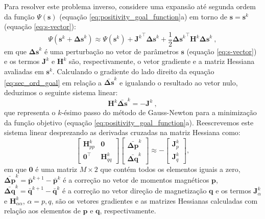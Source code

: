 Para resolver este problema inverso, considere uma expansão até segunda ordem da função $\Psi(\mathbf{s})$
(equação \ref{eq:positivity_goal_function}a) em torno de $\mathbf{s} = \mathbf{s}^{k}$ 
(equação \ref{eq:s-vector}):
\begin{equation}
\Psi(\mathbf{s}^{k} + \mathbf{\Delta s}^{k}) \approx \Psi(\mathbf{s}^{k}) + 
{\mathbf{J}^{k}}^{\top} \mathbf{\Delta s}^{k} + 
\frac{1}{2} {\mathbf{\Delta s}^{k}}^{\top} \mathbf{H}^{k} \mathbf{\Delta s}^{k}  \: ,
\label{eq:sec_ord_goal}
\end{equation}
em que $\mathbf{\Delta s}^{k}$ é uma perturbação no vetor de parâmetros $\mathbf{s}$ 
(equação \ref{eq:s-vector}) e os termos 
$\mathbf{J}^{k}$ e $\mathbf{H}^{k}$ são, respectivamente, o vetor gradiente e a matriz Hessiana avaliadas em $\mathbf{s}^{k}$. 
Calculando o gradiente do lado direito da equação \ref{eq:sec_ord_goal} em relação a $\bar{\mathbf{\Delta s}}^{k}$
e igualando o resultado ao vetor nulo, deduzimos o seguinte sistema linear:
\begin{equation}
\mathbf{H}^{k} \bar{\mathbf{\Delta s}}^{k} = - \mathbf{J}^{k} \: ,
\label{eq:linear_sys_GN}
\end{equation}
que representa o $k$-ésimo passo do método de Gauss-Newton \citep{aster2005} para a minimização da função objetivo (equação \ref{eq:positivity_goal_function}a). Reescrevemos este sistema linear desprezando as derivadas cruzadas na matriz Hessiana como: 
\begin{equation}
\left[
\begin{array}{c|c}
\mathbf{H}_{pp}^{k} & \mathbf{0} \\
\hline
\mathbf{0}^{\top} & \mathbf{H}_{qq}^{k}
\end{array}
\right] \left[ \begin{array}{c}
\bar{\mathbf{\Delta p}}^{k} \\ 
\bar{\mathbf{\Delta q}}^{k} 
\end{array} \right] \approx -\left[ \begin{array}{c}
\mathbf{J}_{p}^{k} \\ 
\mathbf{J}_{q}^{k} 
\end{array} \right] ,
\label{eq:linear_sys_GN_block}
\end{equation}
em que $\mathbf{0}$ é uma matriz $M \times 2$ que contém todos os elementos iguais a zero, 
$\bar{\mathbf{\Delta p}}^{k} = \bar{\mathbf{p}}^{k+1} - \bar{\mathbf{p}}^{k}$ é a correção no vetor de momentos magnéticos 
$\mathbf{p}$, $\bar{\mathbf{\Delta q}}^{k} = \bar{\mathbf{q}}^{k+1} - \bar{\mathbf{q}}^{k}$ é a correção no vetor direção 
de magnetização $\mathbf{q}$ e os termos $\mathbf{J}_{\alpha}^{k}$ e $\mathbf{H}_{\alpha \alpha}^{k}$, $\alpha = p,q$, 
são os vetores gradientes e as matrizes Hessianas calculadas com relação aos elementos de $\mathbf{p}$ e $\mathbf{q}$, 
respectivamente. 

